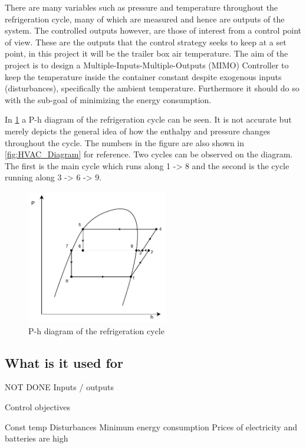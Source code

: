 There are many variables such as pressure and temperature throughout the refrigeration cycle, many of which are measured and hence are outputs of the system. 
The controlled outputs however, are those of interest from a control point of view. These are the outputs that the control strategy seeks to keep at a set point, in this project it will be the trailer box air temperature. The aim of the project is to design a Multiple-Inputs-Multiple-Outputs (MIMO) Controller to keep the temperature inside the container constant despite exogenous inputs (disturbances), specifically the ambient temperature. Furthermore it should do so with the sub-goal of minimizing the energy consumption.


In \cref{fig:p-h_diagram} a P-h diagram of the refrigeration cycle can be seen. It is not accurate but merely depicts the general idea of how the enthalpy and pressure changes throughout the cycle. The numbers in the figure are also shown in \cref{fig:HVAC_Diagram} for reference. Two cycles can be observed on the diagram. The first is the main cycle which runs along 1 -> 8 and the second is the cycle running along 3 -> 6 -> 9.

\begin{figure}[h!]
	\centering
	\includegraphics[width=0.55\textwidth]{Graphics/Flash_Tank_P-h_Diagram}
	\caption{P-h diagram of the refrigeration cycle}
	\label{fig:p-h_diagram}
\end{figure}




\subsection{What is it used for}


	
NOT DONE
Inputs / outputs

Control objectives

	Const temp
		Disturbances
	Minimum energy consumption
		Prices of electricity and batteries are high
		
